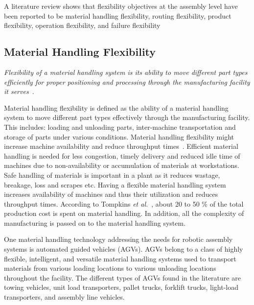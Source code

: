 A literature review shows that flexibility objectives at the assembly level have been reported to be material handling flexibility, routing flexibility, product flexibility, operation flexibility, and failure flexibility~\cite{Wiendahl.2007,Parker.1999,Diffner.2011}

\subsection{Material Handling Flexibility}

\emph{Flexibility of a material handling system is its ability to move different part types efficiently for proper positioning and processing through the manufacturing facility it serves}~\cite{Sethi.1990}.

Material handling flexibility is defined as the ability of a material handling system to move different part types effectively through the manufacturing facility. This includes: loading and unloading parts, inter-machine transportation and storage of parts under various conditions. Material handling flexibility might increase machine availability and reduce throughput times~\cite{Diffner.2011}. Efficient material handling is needed for less congestion, timely delivery and reduced idle time of machines due to non-availability or accumulation of materials at workstations. Safe handling of materials is important in a plant as it reduces wastage, breakage, loss and scrapes etc. Having a flexible material handling system increases availability of machines and thus their utilization and reduces throughput times. According to Tompkins \textit{et al.}~\cite{Tompkins.book}, about 20 to 50 \% of the total production cost is spent on material handling. In addition, all the complexity of manufacturing is passed on to the material handling system.

One material handling technology addressing the needs for robotic assembly systems is automated guided vehicles (AGVs). AGVs belong to a class of highly flexible, intelligent, and versatile material handling systems used to transport materials from various loading locations to various unloading locations throughout the facility. The different types of AGVs found in the literature are towing vehicles, unit load transporters, pallet trucks, forklift trucks, light-load transporters, and assembly line vehicles.


